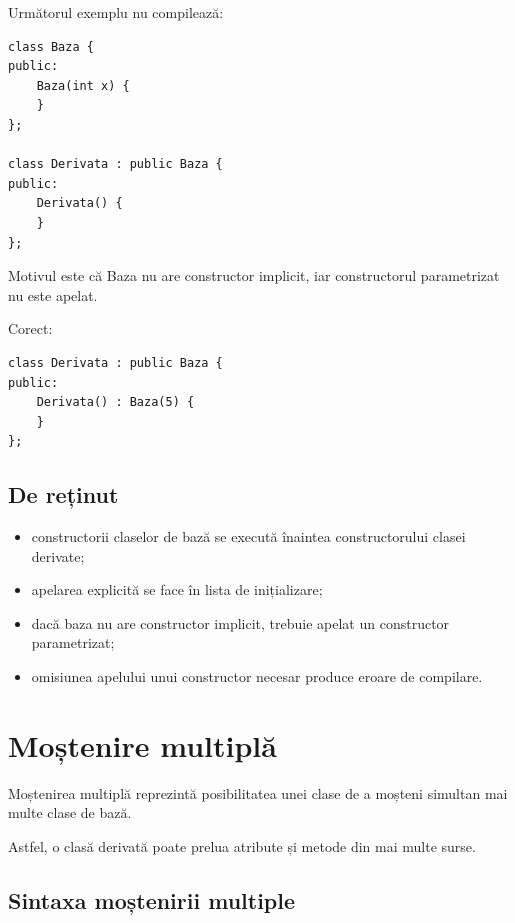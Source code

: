 \documentclass[12pt,a4paper]{article}
\begin{document}
Următorul exemplu nu compilează:

\begin{verbatim}
class Baza {
public:
    Baza(int x) {
    }
};

class Derivata : public Baza {
public:
    Derivata() {
    }
};
\end{verbatim}

Motivul este că Baza nu are constructor implicit, iar constructorul parametrizat nu este apelat.

Corect:

\begin{verbatim}
class Derivata : public Baza {
public:
    Derivata() : Baza(5) {
    }
};
\end{verbatim}

\subsection{De reținut}

\begin{itemize}
\item constructorii claselor de bază se execută înaintea constructorului clasei derivate;
\item apelarea explicită se face în lista de inițializare;
\item dacă baza nu are constructor implicit, trebuie apelat un constructor parametrizat;
\item omisiunea apelului unui constructor necesar produce eroare de compilare.
\end{itemize}















\section{Moștenire multiplă}

Moștenirea multiplă reprezintă posibilitatea unei clase de a moșteni simultan mai multe clase de bază.

Astfel, o clasă derivată poate prelua atribute și metode din mai multe surse.

\subsection{Sintaxa moștenirii multiple}
\end{document}
